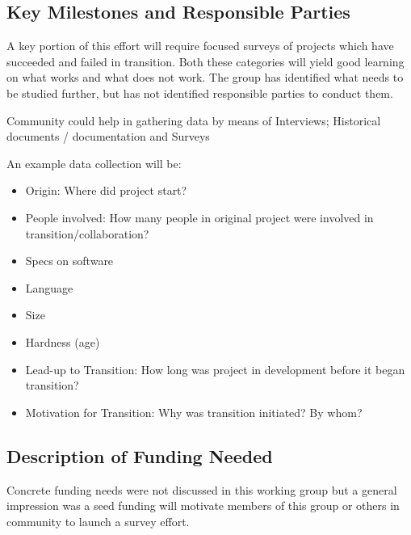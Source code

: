 \subsection{Key Milestones and Responsible Parties}
A key portion of this effort will require focused surveys of projects which have succeeded and failed in transition. Both these categories will yield good learning on what works and what does not work. The group has identified what needs to be studied further, but has not identified responsible parties to conduct them.

Community could help in gathering data by means of Interviews; Historical documents / documentation and Surveys

An example data collection will be: 
\begin{itemize}
\item Origin: Where did project start? 
\item People involved: How many people in original project were involved in transition/collaboration? 
\item Specs on software
\item Language
\item Size
\item Hardness (age)
\item Lead-up to Transition: How long was project in development before it began transition?
\item Motivation for Transition: Why was transition initiated? By whom? 
\end{itemize}

\subsection{Description of Funding Needed}
Concrete funding needs were not discussed in this working group but a general impression was a seed funding will motivate members of this group or others in community to launch a survey effort. 
